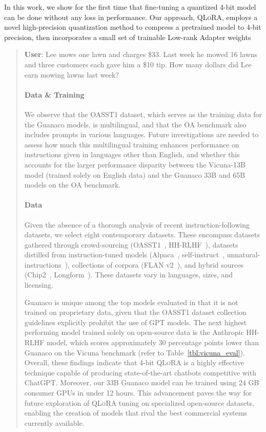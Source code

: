 In this work, we show for the first time that fine-tuning a quantized 4-bit model can be done without any loss in performance. Our approach, \textsc{QLoRA}, employs a novel high-precision quantization method to compress a pretrained model to 4-bit precision, then incorporates a small set of trainable Low-rank Adapter weights \citep{hu2021lora} 

\begin{quote}
    \textbf{User}: Lee mows one lawn and charges \$33. Last week he mowed 16 lawns and three customers each gave him a \$10 tip. How many dollars did Lee earn mowing lawns last week?

\paragraph{Data \& Training} We observe that the OASST1 dataset, which serves as the training data for the {Guanaco} models, is multilingual, and that the OA benchmark also includes prompts in various languages. Future investigations are needed to assess how much this multilingual training enhances performance on instructions given in languages other than English, and whether this accounts for the larger performance disparity between the Vicuna-13B model (trained solely on English data) and the {Guanaco} 33B and 65B models on the OA benchmark.

\paragraph{Data} Given the absence of a thorough analysis of recent instruction-following datasets, we select eight contemporary datasets. These encompass datasets gathered through crowd-sourcing (OASST1~\citep{kopf2023openassistant}, HH-RLHF~\citep{bai2022training}), datasets distilled from instruction-tuned models (Alpaca~\citep{alpaca}, self-instruct~\citep{wang2022self}, unnatural-instructions~\citep{honovich2022unnatural}), collections of corpora (FLAN v2~\citep{chung2022scaling}), and hybrid sources (Chip2~\citep{laion2023}, Longform~\citep{koksal2023longform}). These datasets vary in languages, sizes, and licensing.

{Guanaco} is unique among the top models evaluated in that it is not trained on proprietary data, given that the OASST1 dataset collection guidelines explicitly prohibit the use of GPT models. The next highest performing model trained solely on open-source data is the Anthropic HH-RLHF model, which scores approximately 30 percentage points lower than {Guanaco} on the Vicuna benchmark (refer to Table~\ref{tbl:vicuna_eval}). Overall, these findings indicate that 4-bit \textsc{QLoRA} is a highly effective technique capable of producing state-of-the-art chatbots competitive with ChatGPT. Moreover, our 33B {Guanaco} model can be trained using 24 GB consumer GPUs in under 12 hours. This advancement paves the way for future exploration of \textsc{QLoRA} tuning on specialized open-source datasets, enabling the creation of models that rival the best commercial systems currently available.


\end{quote}

